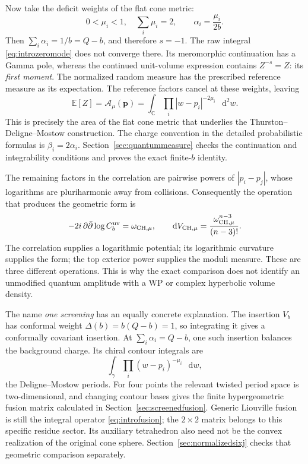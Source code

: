 \documentclass[11pt,a4paper]{article}
\numberwithin{equation}{section}
\theoremstyle{definition}
\theoremstyle{remark}
\newcommand{\dd}{\mathop{}\!\mathrm d}
\newcommand{\CC}{\mathbb C}
\begin{document}
Now take the deficit weights of the flat cone metric:
\[
 0<\mu_i<1,\quad \sum_i\mu_i=2,\qquad
 \alpha_i=\frac{\mu_i}{2b}.
\]
Then $\sum_i\alpha_i=1/b=Q-b$, and therefore $s=-1$.
The raw integral \eqref{eq:introzeromode} does not converge there.
Its meromorphic continuation has a Gamma pole, whereas the
continued unit-volume expression contains $Z^{-s}=Z$: its
\emph{first moment}. The normalized random measure has the prescribed
reference measure as its expectation. The reference factors cancel
at these weights, leaving
\begin{equation}
 \mathbb E[Z]=\mathcal A_\mu(\boldsymbol p)
   =\int_{\CC}\prod_i|w-p_i|^{-2\mu_i}\,\dd^2w.
 \label{eq:introfirstmoment}
\end{equation}
This is precisely the area of the flat cone metric that underlies
the Thurston--Deligne--Mostow construction. The charge convention
in the detailed probabilistic formulas is $\beta_i=2\alpha_i$.
Section~\ref{sec:quantummeasure} checks the continuation and
integrability conditions and proves the exact finite-$b$ identity.

The remaining factors in the correlation are pairwise powers of
$|p_i-p_j|$, whose logarithms are pluriharmonic away from collisions.
Consequently the operation that produces the geometric form is
\begin{equation}
 -2i\,\partial\bar\partial\log C_b^{\rm uv}
     =\omega_{\mathrm{CH},\mu},\qquad
 \dd V_{\mathrm{CH},\mu}
     =\frac{\omega_{\mathrm{CH},\mu}^{n-3}}{(n-3)!}.
 \label{eq:introcurvaturemeasure}
\end{equation}
The correlation supplies a logarithmic potential; its logarithmic
curvature supplies the form; the top exterior power supplies the
moduli measure. These are three different operations. This is why
the exact comparison does not identify an unmodified quantum
amplitude with a WP or complex hyperbolic volume density.

The name \emph{one screening} has an equally concrete explanation.
The insertion $V_b$ has conformal weight
$\Delta(b)=b(Q-b)=1$, so integrating it gives a conformally
covariant insertion. At $\sum_i\alpha_i=Q-b$, one such insertion
balances the background charge. Its chiral contour integrals are
\[
 \int_\gamma\prod_i(w-p_i)^{-\mu_i}\,\dd w,
\]
the Deligne--Mostow periods. For four points the relevant twisted
period space is two-dimensional, and changing contour bases gives
the finite hypergeometric fusion matrix calculated in
Section~\ref{sec:screenedfusion}. Generic Liouville fusion is still
the integral operator \eqref{eq:introfusion}; the $2\times2$ matrix
belongs to this specific residue sector. Its auxiliary tetrahedron
also need not be the convex realization of the original cone
sphere. Section~\ref{sec:normalizedsixj} checks that geometric
comparison separately.
\end{document}
